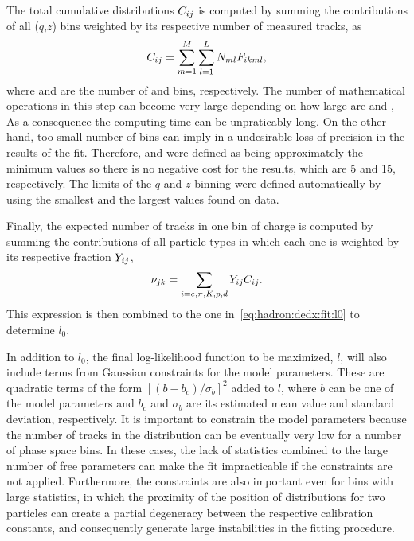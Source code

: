 The total cumulative distributions $C_{ij}$ is computed by summing
the contributions of all ($q$,$z$) bins weighted by its respective
number of measured tracks, as
\begin{equation}
  C_{ij} = \sum_{m=1}^{M} \sum_{l=1}^{L} N_{ml} F_{ikml},
\end{equation}
where \nq and \nz are the number of \iq and \iz bins, respectively.
The number of mathematical operations in this step
can become very large depending on how large are \nq and \nz,
As a consequence the computing time can be unpraticably long.
On the other hand,
too small number of bins can imply in a undesirable loss of precision
in the results of the fit. Therefore, \nq and \nz were defined
as being approximately the minimum values so there is no negative cost
for the results, which are 5 and 15, respectively.
The limits of the $q$ and $z$ binning were defined automatically
by using the smallest and the largest values found on data.

Finally, the expected number of tracks in one \ieps bin of charge \ich
is computed by summing the contributions of all particle types
in which each one is weighted by its respective fraction $Y_{ij}$,
\begin{equation}
  \nu_{jk} = \sum_{i=e,\pi,K,p,d} Y_{ij} C_{ij}.
  \label{eq:hadron:dedx:fit:exp}
\end{equation}
This expression is then combined to the one in~\cref{eq:hadron:dedx:fit:l0}
to determine $l_0$.

In addition to $l_0$, the final log-likelihood function
to be maximized, $l$,
will also include terms from Gaussian constraints for the model
parameters. These are quadratic terms of the
form $\left[(b-b_c)/\sigma_b\right]^2$ added to $l$,
where $b$ can be one of the model parameters and 
$b_c$ and $\sigma_b$ are its
estimated mean value and standard deviation, respectively.
It is important to constrain the model parameters because
the number of tracks in the \eps distribution
can be eventually very low for a number of phase space bins.
In these cases, the lack of statistics combined to
the large number of free parameters can make the fit
impracticable if the constraints are not applied.
Furthermore, the constraints are also important
even for bins with large statistics,
in which the proximity of the position of \eps distributions
for two particles can create a partial degeneracy
between the respective calibration constants,
and consequently
generate large instabilities in the fitting procedure.

